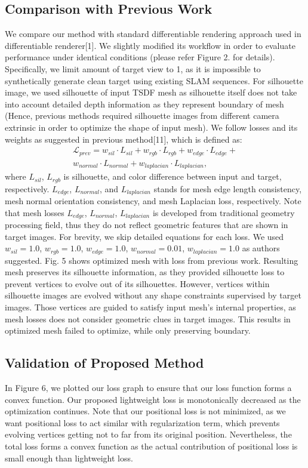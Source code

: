 \subsection{Comparison with Previous Work}
We compare our method with standard differentiable rendering approach used in differentiable renderer[1]. 
We slightly modified its workflow in order to evaluate performance under identical conditions (please refer Figure 2. for details). 
Specifically, we limit amount of target view to 1, as it is impossible to synthetically generate clean target using existing SLAM sequences. 
For silhouette image, we used silhouette of input TSDF mesh as silhouette itself does not take into account detailed depth information as they represent boundary of mesh (Hence, previous methods required silhouette images from different camera extrinsic in order to optimize the shape of input mesh). 
We follow losses and its weights as suggested in previous method[11], which is defined as: 
\begin{multline*}
    \mathcal{L}_{prev}=w_{sil}\cdot L_{sil}+w_{rgb}\cdot L_{rgb}+w_{edge}\cdot L_{edge}+ \\ 
    w_{normal}\cdot L_{normal}+w_{laplacian}\cdot L_{laplacian}, 
\end{multline*}
where $L_{sil}$, $L_{rgb}$ is silhouette, and color difference between input and target, respectively. 
$L_{edge}$, $L_{normal}$, and $L_{laplacian}$ stands for mesh edge length consistency, mesh normal orientation consistency, and mesh Laplacian loss, respectively. 
Note that mesh losses $L_{edge}$, $L_{normal}$, $L_{laplacian}$ is developed from traditional geometry processing field, thus they do not reflect geometric features that are shown in target images. 
For brevity, we skip detailed equations for each loss. 
We used $w_{sil}=1.0$, $w_{rgb}=1.0$, $w_{edge}=1.0$, $w_{normal}=0.01$, $w_{laplacian}=1.0$ as authors suggested.
Fig. 5 shows optimized mesh with loss from previous work. 
Resulting mesh preserves its silhouette information, as they provided silhouette loss to prevent vertices to evolve out of its silhouettes. 
However, vertices within silhouette images are evolved without any shape constraints supervised by target images. 
Those vertices are guided to satisfy input mesh’s internal properties, as mesh losses does not consider geometric clues in target images. 
This results in optimized mesh failed to optimize, while only preserving boundary.

\subsection{Validation of Proposed Method}
In Figure 6, we plotted our loss graph to ensure that our loss function forms a convex function. 
Our proposed lightweight loss is monotonically decreased as the optimization continues. 
Note that our positional loss is not minimized, as we want positional loss to act similar with regularization term, which prevents evolving vertices getting not to far from its original position. 
Nevertheless, the total loss forms a convex function as the actual contribution of positional loss is small enough than lightweight loss. 


